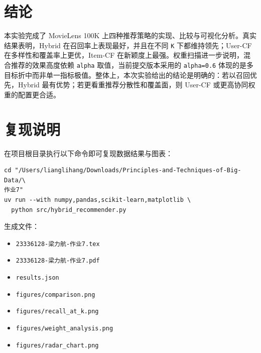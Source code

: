 \documentclass[UTF8,a4paper,12pt,fontset=fandol]{ctexart}
\begin{document}
\section{结论}
本实验完成了 MovieLens 100K 上四种推荐策略的实现、比较与可视化分析。真实结果表明，Hybrid 在召回率上表现最好，并且在不同 \texttt{K} 下都维持领先；User-CF 在多样性和覆盖率上更优，Item-CF 在新颖度上最强。权重扫描进一步说明，混合推荐的效果高度依赖 \texttt{alpha} 取值，当前提交版本采用的 \texttt{alpha=0.6} 体现的是多目标折中而非单一指标极值。整体上，本次实验给出的结论是明确的：若以召回优先，Hybrid 最有优势；若更看重推荐分散性和覆盖面，则 User-CF 或更高协同权重的配置更合适。

\section{复现说明}
在项目根目录执行以下命令即可复现数据结果与图表：
\begin{verbatim}
cd "/Users/lianglihang/Downloads/Principles-and-Techniques-of-Big-Data/\
作业7"
uv run --with numpy,pandas,scikit-learn,matplotlib \
  python src/hybrid_recommender.py
\end{verbatim}

生成文件：
\begin{itemize}[leftmargin=2.2em]
    \item \texttt{23336128-梁力航-作业7.tex}
    \item \texttt{23336128-梁力航-作业7.pdf}
    \item \texttt{results.json}
    \item \texttt{figures/comparison.png}
    \item \texttt{figures/recall\_at\_k.png}
    \item \texttt{figures/weight\_analysis.png}
    \item \texttt{figures/radar\_chart.png}
\end{itemize}
\end{document}
